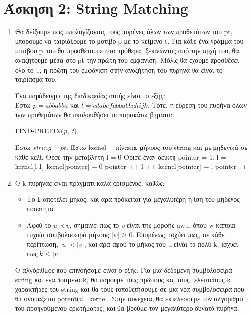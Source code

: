 \documentclass{article}
\begin{document}
\section*{\large Άσκηση 2: String Matching}
\begin{enumerate}
\item  Θα δείξουμε πως υπολογίζοντας τους πυρήνες όλων των προθεμάτων του pt, μπορούμε να ταιριάξουμε το μοτίβο p με το κείμενο t. 
Για κάθε ένα γράμμα του μοτίβου p που θα προσθέτουμε στο πρόθεμα, ξεκινώντας από την αρχή του, θα αναζητούμε μέσα στο pt την πρώτη του εμφάνιση. Μόλις θα έχουμε προσθέσει όλο το p, η πρώτη του εμφάνιση στην αναζήτηση του πυρήνα θα είναι το ταίριασμά του. 

Ένα παράδειγμα της διαδικασίας αυτής είναι το εξής: \\ 
 Έστω $p = abbabba$ και $t = cdabefabbabbahijk$. Τότε, η εύρεση του πυρήνα όλων των προθεμάτων θα ακολουθήσει τα παρακάτω βήματα:\\

\begin{algorithm}[H]
\caption{FIND-PREFIX(\textit{p, t})}
\begin{algorithmic}[1]
    \State Έστω \( string = pt \).
    \State Έστω kernel = πίνακας μήκους του string και με μηδενικά σε κάθε κελί. 
    \State Θέσε την μεταβλητή l = 0
    \State Όρισε έναν δείκτη pointer = 1.
			\State l = kernel[l-1] 
		\Else 
			\State kernel[pointer] = 0
			\State pointer ++
        	\EndIf 
        \Else 
        	\State l ++
		\State kernel[pointer] = l
		\State pointer++
	  \EndIf
    \EndWhile
\end{algorithmic}
\end{algorithm}


\item Ο k-πυρήνας είναι πράγματι καλά ορισμένος, καθώς:
\begin{itemize}
\item Το k αποτελεί μήκος, και άρα πρόκειται για μεγαλύτερη ή ίση του μηδενός ποσότητα
\item Αφού το $u \prec v$, σημαίνει πως το \textit{v} είναι της μορφής uwu, όπου w κάποια τυχαία συμβολοσειρά μήκους $|w| \geq 0$. Επομένως, ισχύει πως, σε κάθε περίπτωση, $|u|< |v|$, και άρα αφού το μήκος του u είναι το πολύ k, ισχύει πως $k \leq |v|$. 
\end{itemize}
 
Ο αλγόριθμος που επινοήσαμε είναι ο εξής: 
Για μια δεδομένη συμβολοσειρά string και ένα δοσμένο k, θα πάρουμε τους πρώτους και τους τελευταίους k χαρακτήρες του string και θα τους τοποθετήσουμε σε μια νέα συμβολοσειρά που θα ονομάζεται potential\_kernel. Στην συνέχεια, θα εκτελέσουμε τον αλγόριθμο του προηγούμενου ερωτήματος, και θα βρούμε τον μεγαλύτερο δυνατό πυρήνα.  

\end{enumerate}
\end{document}
